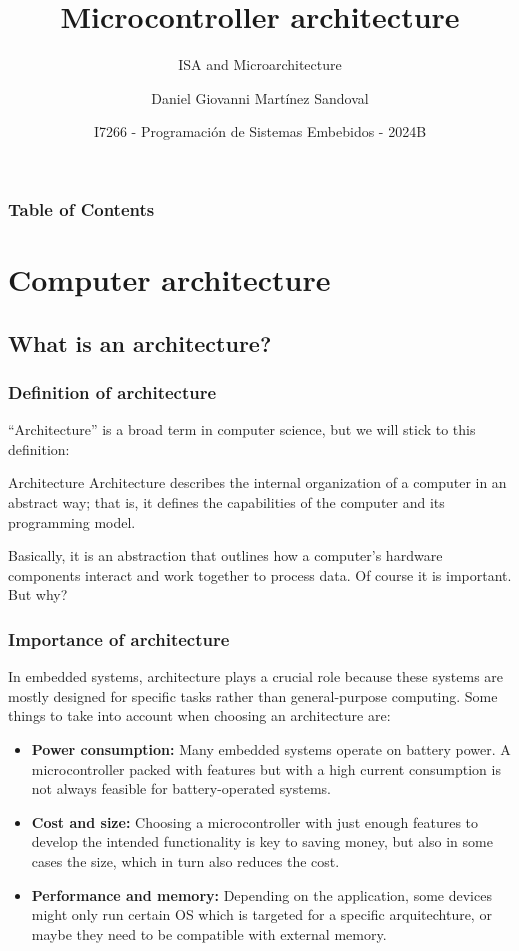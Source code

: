\documentclass[aspectratio=169]{beamer}
\title[Microcontroller architecture] %
{Microcontroller architecture}
\subtitle{ISA and Microarchitecture}
\author{Daniel Giovanni Martínez Sandoval}
\institute[CUCEI - UDG]
{
  \textsc{
    \textbf{Universidad de Guadalajara}\\
    {\tiny Centro Universitario de Ciencias Exactas e Ingenierías}
  }
}
\date[September 2024] %
{\footnotesize I7266 - Programación de Sistemas Embebidos - 2024B }
\begin{document}
\frame{\titlepage}


\begin{frame}
\frametitle{Table of Contents}
\tableofcontents
\end{frame}


\section{Computer architecture}
\subsection{What is an architecture?}

\begin{frame}
  \frametitle{Definition of architecture}
  ``Architecture'' is a broad term in computer science, but we will stick to this definition: \pause
  \begin{block}{Architecture}
    Architecture describes the internal organization of a computer in an abstract way; that is, it deﬁnes the capabilities of the computer and its programming model.\cite{clements} \pause
  \end{block}
  Basically, it is an abstraction that outlines how a computer's hardware components interact and work together to process data. Of course it is important. But why?
  \end{frame}

\begin{frame}
  \frametitle{Importance of architecture}
  In embedded systems, architecture plays a crucial role because these systems are mostly designed for specific tasks rather than general-purpose computing. Some things to take into account when choosing an architecture are:\pause
  \begin{itemize}
    \item <2-> \textbf{Power consumption:} Many embedded systems operate on battery power. A microcontroller packed with features but with a high current consumption is not always feasible for battery-operated systems. 
    \item <3-> \textbf{Cost and size:} Choosing a microcontroller with just enough features to develop the intended functionality is key to saving money, but also in some cases the size, which in turn also reduces the cost.
    \item <4-> \textbf{Performance and memory:} Depending on the application, some devices might only run certain OS which is targeted for a specific arquitechture, or maybe they need to be compatible with external memory. 
  \end{itemize}
\end{frame}
\end{document}
